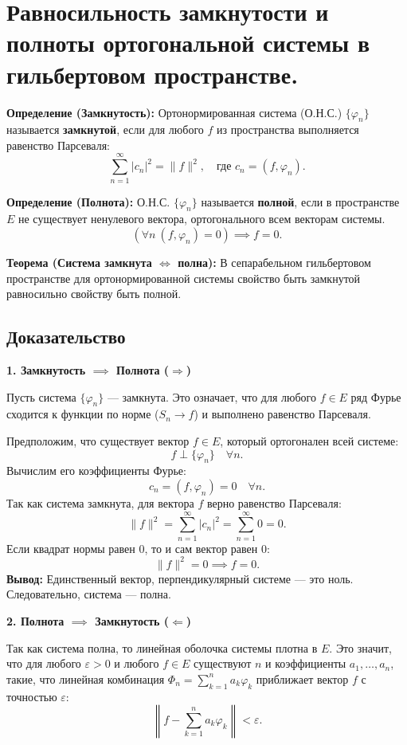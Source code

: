 \documentclass[12pt,a4paper,openany]{book}
\begin{document}
\section{Равносильность замкнутости и полноты ортогональной системы в гильбертовом пространстве.}

\textbf{Определение (Замкнутость):}
Ортонормированная система (О.Н.С.) $\{\varphi_n\}$ называется \textbf{замкнутой}, если для любого $f$ из пространства выполняется равенство Парсеваля:
\[
\sum_{n=1}^\infty |c_n|^2 = \|f\|^2, \quad \text{где } c_n = (f, \varphi_n).
\]

\textbf{Определение (Полнота):}
О.Н.С. $\{\varphi_n\}$ называется \textbf{полной}, если в пространстве $E$ не существует ненулевого вектора, ортогонального всем векторам системы.
\[
(\forall n \ (f, \varphi_n) = 0) \implies f = 0.
\]

\textbf{Теорема (Система замкнута $\iff$ полна):}
В сепарабельном гильбертовом пространстве для ортонормированной системы свойство быть замкнутой равносильно свойству быть полной.

\subsection{Доказательство}

\textbf{1. Замкнутость $\implies$ Полнота ($\Rightarrow$)}

Пусть система $\{\varphi_n\}$ — замкнута. Это означает, что для любого $f \in E$ ряд Фурье сходится к функции по норме ($S_n \to f$) и выполнено равенство Парсеваля.

Предположим, что существует вектор $f \in E$, который ортогонален всей системе:
\[
f \perp \{\varphi_n\} \quad \forall n.
\]
Вычислим его коэффициенты Фурье:
\[
c_n = (f, \varphi_n) = 0 \quad \forall n.
\]
Так как система замкнута, для вектора $f$ верно равенство Парсеваля:
\[
\|f\|^2 = \sum_{n=1}^\infty |c_n|^2 = \sum_{n=1}^\infty 0 = 0.
\]
Если квадрат нормы равен 0, то и сам вектор равен 0:
\[
\|f\|^2 = 0 \implies f = 0.
\]
\textbf{Вывод:} Единственный вектор, перпендикулярный системе — это ноль. Следовательно, система — полна.

\vspace{1em}

\textbf{2. Полнота $\implies$ Замкнутость ($\Leftarrow$)}

Так как система полна, то линейная оболочка системы плотна в $E$. Это значит, что для любого $\varepsilon > 0$ и любого $f \in E$ существуют $n$ и коэффициенты $a_1, \dots, a_n$, такие, что линейная комбинация $\Phi_n = \sum_{k=1}^n a_k \varphi_k$ приближает вектор $f$ с точностью $\varepsilon$:
\[
\left\| f - \sum_{k=1}^n a_k \varphi_k \right\| < \varepsilon.
\]
\end{document}
